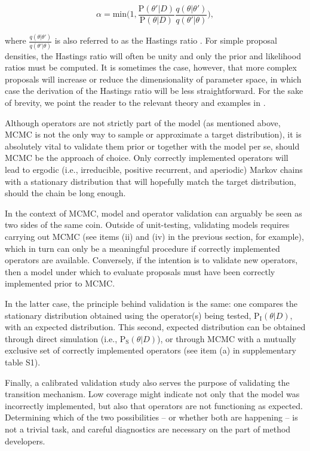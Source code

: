 \documentclass[oneside]{article}
\begin{document}
\begin{equation}
  \alpha = \text{min}\bigg(1, \frac{\text{P}(\theta'|D)}{\text{P}(\theta|D)} \frac{q(\theta|\theta')}{q(\theta'|\theta)} \bigg),
\end{equation}

\noindent where $\frac{q(\theta|\theta')}{q(\theta'|\theta)}$ is also
referred to as the Hastings ratio \citep{smith93,tierney94,gelman}.
For simple proposal densities, the Hastings ratio will often be unity and
only the prior and likelihood ratios must be computed.
It is sometimes the case, however, that more complex proposals will
increase or reduce the dimensionality of parameter space, in which
case the derivation of the Hastings ratio will be less straightforward.
For the sake of brevity, we point the reader to the relevant theory
and examples in \citep{green95,huelsenbeck04,drummond10}.

Although operators are not strictly part of the model (as mentioned
above, MCMC is not the only way to sample or approximate a target
distribution), it is absolutely vital to validate them prior or
together with the model per se, should MCMC be the approach of choice.
Only correctly implemented operators will lead to ergodic (i.e.,
irreducible, positive recurrent, and aperiodic) Markov
chains with a stationary distribution that will hopefully match
the target distribution, should the chain be long enough.

In the context of MCMC, model and operator validation can arguably be
seen as two sides of the same coin.
Outside of unit-testing, validating models requires carrying out MCMC
(see items (ii) and (iv) in the previous section, for example), which
in turn can only be a meaningful procedure if correctly implemented
operators are available.
Conversely, if the intention is to validate new operators, then a
model under which to evaluate proposals must have been correctly
implemented prior to MCMC.

In the latter case, the principle behind validation is the same: one
compares the stationary distribution obtained using the operator(s)
being tested, $\text{P}_{\text{I}}(\theta|D)$, with an expected
distribution.
This second, expected distribution can be obtained through direct
simulation (i.e., $\text{P}_{\text{S}}(\theta|D)$), or through MCMC
with a mutually exclusive set of correctly implemented operators (see
item (a) in supplementary table S1).

Finally, a calibrated validation study also serves the purpose of
validating the transition mechanism.
Low coverage might indicate not only that the model was incorrectly
implemented, but also that operators are not functioning as expected.
Determining which of the two possibilities -- or whether both are
happening -- is not a trivial task, and careful diagnostics are
necessary on the part of method developers.
\end{document}
